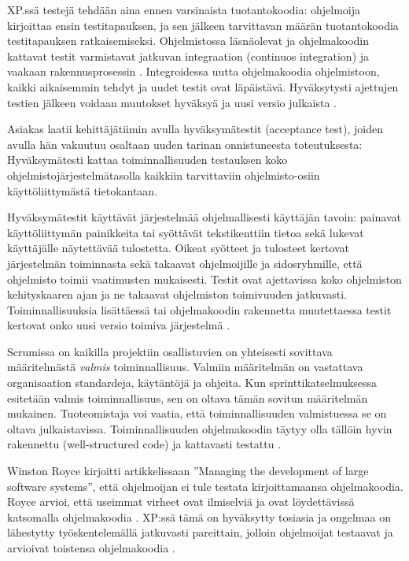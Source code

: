 \documentclass[finnish]{tktltiki2}
\theoremstyle{definition}
\theoremstyle{remark}
\begin{document}
XP.ssä testejä tehdään aina ennen varsinaista tuotantokoodia: ohjelmoija kirjoittaa ensin testitapauksen, ja sen jälkeen tarvittavan määrän tuotantokoodia testitapauksen ratkaisemiseksi. Ohjelmistossa läsnäolevat ja ohjelmakoodin kattavat testit varmistavat jatkuvan integraation (continuos integration) ja vaakaan rakennusprosessin \cite{FOW01a}. Integroidessa uutta ohjelmakoodia ohjelmistoon, kaikki aikaisemmin tehdyt ja uudet testit ovat läpäistävä. Hyväksytysti ajettujen testien jälkeen voidaan muutokset hyväksyä ja uusi versio julkaista \cite{BEC99}.

Asiakas laatii kehittäjätiimin avulla hyväksymätestit (acceptance test), joiden avulla hän vakuutuu osaltaan uuden tarinan onnistuneesta toteutuksesta: Hyväksymätesti kattaa toiminnallisuuden testauksen koko ohjelmistojärjestelmätasolla kaikkiin tarvittaviin ohjelmisto-osiin käyttöliittymästä tietokantaan.

Hyväksymätestit käyttävät järjestelmää ohjelmallisesti käyttäjän tavoin: painavat käyttöliittymän painikkeita tai syöttävät tekstikenttiin tietoa sekä lukevat käyttäjälle näytettävää tulostetta. Oikeat syötteet ja tulosteet kertovat järjestelmän toiminnasta sekä takaavat ohjelmoijille ja sidosryhmille, että ohjelmisto toimii vaatimusten mukaisesti. Testit ovat ajettavissa koko ohjelmiston kehityskaaren ajan ja ne takaavat ohjelmiston toimivuuden jatkuvasti. Toiminnallisuuksia lisättäessä tai ohjelmakoodin rakennetta muutettaessa testit kertovat onko uusi versio toimiva järjestelmä \cite{BEC99}.

Scrumissa on kaikilla projektiin osallistuvien on yhteisesti sovittava määritel\-mästä \textit{valmis} toiminnallisuus. Valmiin määritelmän on vastattava organisaation standardeja, käytäntöjä ja ohjeita. Kun sprinttikatselmuksessa esitetään valmis toiminnallisuus, sen on oltava tämän sovitun määritelmän mukainen. Tuoteomistaja voi vaatia, että toiminnallisuuden valmistuessa se on oltava julkaistavissa. Toiminnallisuuden ohjelmakoodin täytyy olla tällöin hyvin rakennettu (well-structured code) ja kattavasti testattu \cite{SCH09}.

Winston Royce kirjoitti artikkelissaan ''Managing the development of large software systems'', että ohjelmoijan ei tule testata kirjoittamaansa ohjelmakoodia. Royce arvioi, että useimmat virheet ovat ilmiselviä ja ovat löydettävissä katsomalla ohjelmakoodia \cite{ROY70}. XP:ssä tämä on hyväksytty tosiasia ja ongelmaa on lähestytty työskentelemällä jatkuvasti pareittain, jolloin ohjelmoijat testaavat ja arvioivat toistensa ohjelmakoodia \cite{BEC99}.
\end{document}
